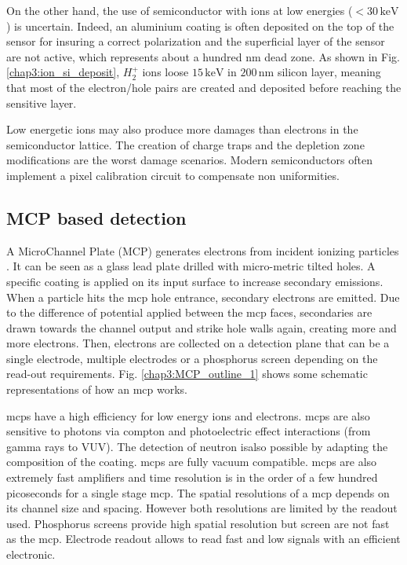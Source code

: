 \begin{refsection}
  On the other hand, the use of semiconductor with ions at low energies ($< 30 \,\mathrm{keV}$) is uncertain. Indeed, an aluminium coating is often deposited on the top of the sensor for insuring a correct polarization and the superficial layer of the sensor are not active, which represents about a hundred nm dead zone. As shown in Fig. \ref{chap3:ion_si_deposit}, $H_{2}^{+}$ ions loose $15\,\mathrm{keV}$ in $200\,\mathrm{nm}$ silicon layer, meaning that most of the electron/hole pairs are created and deposited before reaching the sensitive layer.

  Low energetic ions may also produce more damages than electrons in the semiconductor lattice. The creation of charge traps and the depletion zone modifications are the worst damage scenarios. Modern semiconductors often implement a pixel calibration circuit to compensate non uniformities.

  \subsection{MCP based detection}

  A MicroChannel Plate (MCP) generates electrons from incident ionizing particles \cite{Wiza1979}.
  It can be seen as a glass lead plate drilled with micro-metric tilted holes.
  A specific coating is applied on its input surface to increase secondary emissions. When a particle hits the \acrshort{mcp} hole entrance, secondary electrons are emitted. Due to the difference of potential applied between the \acrshort{mcp} faces, secondaries are drawn towards the channel output and strike hole walls again, creating more and more electrons. Then, electrons are collected on a detection plane that can be a single electrode, multiple electrodes or a phosphorus screen depending on the read-out requirements. Fig. \ref{chap3:MCP_outline_1} shows some schematic representations of how an \acrshort{mcp} works.

  \acrshort{mcp}s have a high efficiency for low energy ions and electrons. \acrshort{mcp}s are also sensitive to photons via compton and photoelectric effect interactions (from gamma rays to VUV). The detection of neutron isalso possible by adapting the composition of the coating. \acrshort{mcp}s are fully vacuum compatible. \acrshort{mcp}s are also extremely fast amplifiers and time resolution is in the order of a few hundred picoseconds for a single stage \acrshort{mcp}. The spatial resolutions of a \acrshort{mcp} depends on its channel size and spacing. However both resolutions are limited by the readout used. Phosphorus screens provide high spatial resolution but screen are not fast as the \acrshort{mcp}. Electrode readout allows to read fast and low signals with an efficient electronic.


\end{refsection}
